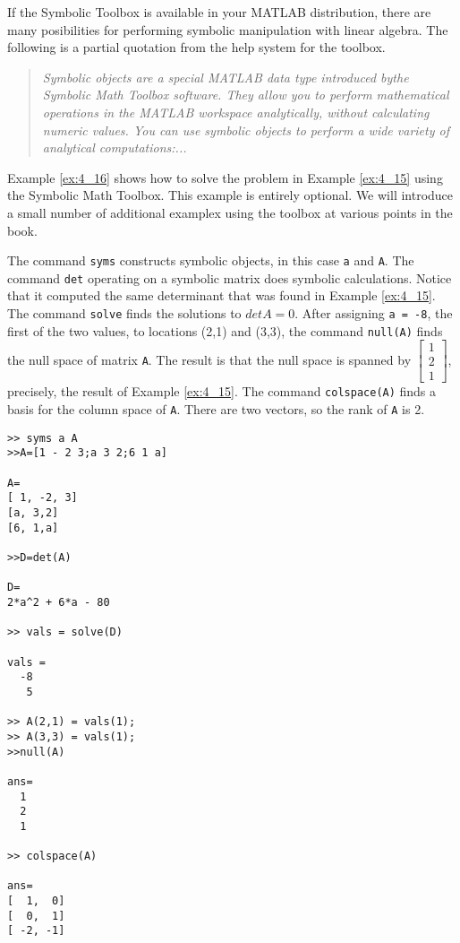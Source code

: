 \documentclass[../main.tex]{subfiles}
\begin{document}
If the Symbolic Toolbox is available in your MATLAB distribution, there are many posibilities for performing symbolic manipulation with linear algebra. The following is a partial quotation from the help system for the toolbox.
\begin{quote}
\textit{
Symbolic objects are a special MATLAB\textregistered{} data type introduced bythe Symbolic Math Toolbox\texttrademark{} software. They allow you to perform mathematical operations in the MATLAB workspace analytically, without calculating numeric values. You can use symbolic objects to perform a wide variety of analytical computations:...}
\end{quote}

Example \ref{ex:4_16} shows how to solve the problem in Example \ref{ex:4_15} using the Symbolic Math Toolbox. This example is entirely optional. We will introduce a small number of additional examplex using the toolbox at various points in the book.

\begin{example} \label{ex:4_16}
  The command \texttt{syms} constructs symbolic objects, in this case \texttt{a} and \texttt{A}. The command \texttt{det} operating on a symbolic matrix does symbolic calculations. Notice that it computed the same determinant that was found in Example \ref{ex:4_15}. The command \texttt{solve} finds the solutions to \(det A = 0\). After assigning \texttt{a = -8}, the first of the two values, to locations (2,1) and (3,3), the command \texttt{null(A)} finds the null space of matrix \texttt{A}. The result is that the null space is spanned by \(\begin{bmatrix}
    1 \\ 2\\ 1
  \end{bmatrix}\),
  precisely, the result of Example \ref{ex:4_15}. The command \texttt{colspace(A)} finds a basis for the column space of \texttt{A}. There are two vectors, so the rank of \texttt{A} is 2.
  
\begin{lstlisting}[numbers=none,frame=none]
>> syms a A
>>A=[1 - 2 3;a 3 2;6 1 a]

A=
[ 1, -2, 3]
[a, 3,2]
[6, 1,a]

>>D=det(A)

D=
2*a^2 + 6*a - 80

>> vals = solve(D)

vals =
  -8
   5
   
>> A(2,1) = vals(1);
>> A(3,3) = vals(1);
>>null(A)

ans=
  1
  2
  1
  
>> colspace(A)

ans=
[  1,  0]
[  0,  1]
[ -2, -1]
\end{lstlisting}
\end{example}
\end{document}
